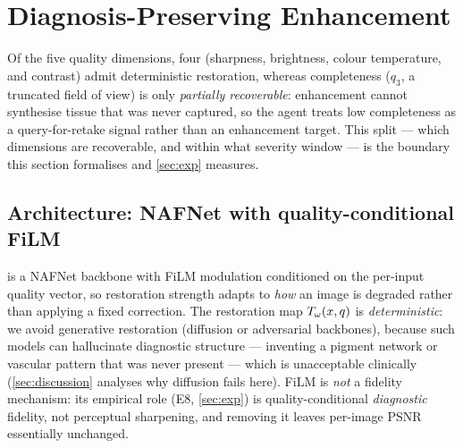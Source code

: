 
\section{Diagnosis-Preserving Enhancement}\label{sec:enhance}

Of the five quality dimensions, four (sharpness, brightness, colour temperature, and contrast) admit
deterministic restoration, whereas completeness ($q_3$, a truncated field of view) is only
\emph{partially recoverable}: enhancement cannot synthesise tissue that was never captured, so the agent
treats low completeness as a query-for-retake signal rather than an enhancement target. This split ---
which dimensions are recoverable, and within what severity window --- is the boundary this section
formalises and \cref{sec:exp} measures.

\subsection{Architecture: NAFNet with quality-conditional FiLM}\label{sec:arch}
\visienhance{} is a NAFNet backbone \citep{chen2022simple} with FiLM modulation \citep{perez2018film}
conditioned on the per-input quality vector, so restoration strength adapts to \emph{how} an image is
degraded rather than applying a fixed correction. The restoration map $T_\omega(x,q)$ is
\emph{deterministic}: we avoid generative restoration (diffusion or adversarial backbones), because such
models can hallucinate diagnostic structure --- inventing a pigment network or vascular pattern that was
never present --- which is unacceptable clinically (\cref{sec:discussion} analyses why diffusion fails
here). FiLM is \emph{not} a fidelity mechanism: its empirical role (E8, \cref{sec:exp}) is
quality-conditional \emph{diagnostic} fidelity, not perceptual sharpening, and removing it leaves
per-image PSNR essentially unchanged.

